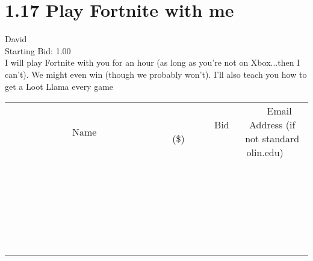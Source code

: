 \documentclass[11pt]{article}
\begin{document}
					\section*{1.17 Play Fortnite with me}
					David \\
					Starting Bid: 1.00 \\
					I will play Fortnite with you for an hour (as long as you're not on Xbox...then I can't). We might even win (though we probably won't). I'll also teach you how to get a Loot Llama every game \\
					[6ex]
					\begin{tabular}{c c c}
						~~~~~~~~~~~~~Name~~~~~~~~~~~~~ & ~~~~~~~~~Bid (\$)~~~~~~~~~ & ~~~Email Address (if not standard olin.edu)~~~ \\
				
 & & \\
\hline
 & & \\
\hline
 & & \\
\hline
 & & \\
\hline
 & & \\
\hline
 & & \\
\hline
 & & \\
\hline
 & & \\
\hline
 & & \\
\hline
 & & \\
\hline
 & & \\
\hline
 & & \\
\hline
 & & \\
\hline
 & & \\
\hline
 & & \\
\hline
 & & \\
\hline
 & & \\
\hline
 & & \\
\hline
 & & \\
\hline
 & & \\
\hline
 & & \\
\hline
 & & \\
\hline
 & & \\
\hline
 & & \\
\hline
 & & \\
\hline
 & & \\
\hline
					\end{tabular}
					\clearpage
				
\end{document}
